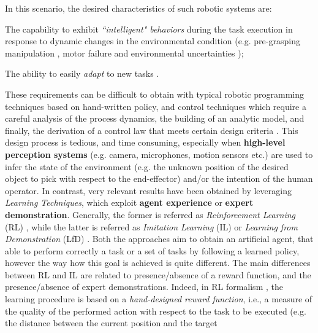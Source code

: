 In this scenario, the desired characteristics of such robotic systems are:\begin{enumerate*}[label=\textbf{(\alph*)}]
    \item The capability to exhibit \textit{``intelligent" behaviors} during the task execution in response to dynamic
    changes in the environmental condition (e.g. pre-grasping manipulation \cite{kalashnikov2018qt_opt}, motor failure
    and environmental uncertainties \cite{anne2021meta_learning_fast_adaptive});
    \item The ability to easily \textit{adapt} to new tasks \cite{jang2022bc_z}. 
\end{enumerate*}
\newline These requirements can be difficult to obtain with typical robotic programming techniques based on hand-written
policy, and control techniques which require a careful analysis of the process dynamics, the building of an analytic
model, and finally, the derivation of a control law that meets certain design criteria
\cite{hafner2011reinforcement_in_feedback_controll}. This design process is tedious, and time consuming, especially when
\textbf{high-level perception systems} (e.g. camera, microphones, motion sensors etc.) are used to infer the state of
the environment (e.g. the unknown position of the desired object to pick with respect to the end-effector) and/or the
intention of the human operator. \newline In contrast, very relevant results have been obtained by leveraging
\textit{Learning Techniques}, which exploit \textbf{agent experience} or \textbf{expert demonstration}. Generally, the
former is referred as \textit{Reinforcement Learning} (RL) \cite{sutton2018reinforcement}, while the latter is referred
as \textit{Imitation Learning} (IL) or \textit{Learning from Demonstration} (LfD)
\cite{argall2009robot_learning_from_demonstration}. Both the approaches aim to obtain an artificial agent, that able to
perform correctly a task or a set of tasks by following a learned policy, however the way how this goal is achieved is
quite different. The main differences between RL and IL are related to presence/absence of a reward function, and the
presence/absence of expert demonstrations. \newline Indeed, in RL formalism \cite{kaelbling1996reinforcement_survey},
the learning procedure is based on a \textit{hand-designed reward function}, i.e., a measure of the quality of the
performed action with respect to the task to be executed (e.g. the distance between the current position and the target
